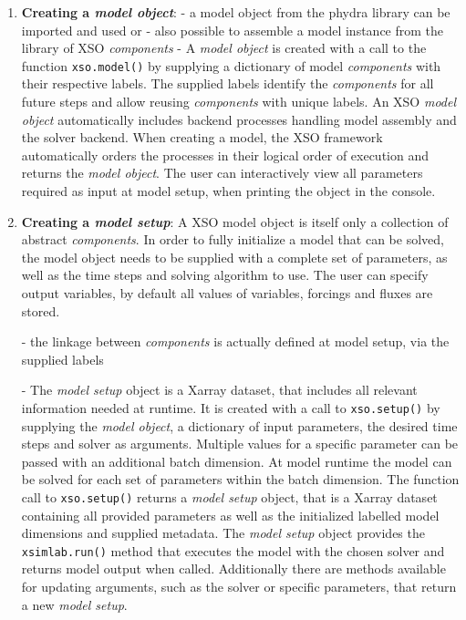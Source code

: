 \documentclass[journal abbreviation, manuscript]{copernicus}
\begin{document}
\begin{enumerate}
    \item \textbf{Creating a \textit{model object}}: 
    - a model object from the phydra library can be imported and used or
    - also possible to assemble a model instance from the library of XSO \textit{components}
    - A \textit{model object} is created with a call to the function \texttt{xso.model()} by supplying a dictionary of model \textit{components} with their respective labels. The supplied labels identify the \textit{components} for all future steps and allow reusing \textit{components} with unique labels. An XSO \textit{model object} automatically includes backend processes handling model assembly and the solver backend. When creating a model, the XSO framework automatically orders the processes in their logical order of execution and returns the \textit{model object}. The user can interactively view all parameters required as input at model setup, when printing the object in the console.

    \item \textbf{Creating a \textit{model setup}}: 
    A XSO model object is itself only a collection of abstract \textit{components}. In order to fully initialize a model that can be solved, the model object needs to be supplied with a complete set of parameters, as well as the time steps and solving algorithm to use. The user can specify output variables, by default all values of variables, forcings and fluxes are stored.
    
    - the linkage between \textit{components} is actually defined at model setup, via the supplied labels
    
    - The \textit{model setup} object is a Xarray dataset, that includes all relevant information needed at runtime. It is created with a call to \texttt{xso.setup()} by supplying the \textit{model object}, a dictionary of input parameters, the desired time steps and solver as arguments. Multiple values for a specific parameter can be passed with an additional batch dimension. At model runtime the model can be solved for each set of parameters within the batch dimension. The function call to \texttt{xso.setup()} returns a \textit{model setup} object, that is a Xarray dataset containing all provided parameters as well as the initialized labelled model dimensions and supplied metadata. The \textit{model setup} object provides the \texttt{xsimlab.run()} method that executes the model with the chosen solver and returns model output when called. Additionally there are methods available for updating arguments, such as the solver or specific parameters, that return a new \textit{model setup}.
    

\end{enumerate}
\end{document}
